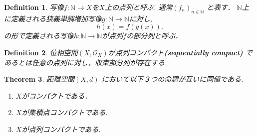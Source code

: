 \documentclass[lualatex]{ltjsbook}
\newtheorem{theorem}{Theorem}[section]
\newtheorem{definition}[theorem]{Definition}
\theoremstyle{remark}
\theoremstyle{plain}
\begin{document}
\begin{definition}
	 写像$f: \mathbb{N} \to X$を$X$上の点列と呼ぶ. 
	 通常$(f_n)_{n \in \mathbb{N}}$ と表す．
	 $\mathbb{N}$上に定義される狭義単調増加写像$g: \mathbb{N} \to  \mathbb{N}$に対し, 
	 \[
	 h(x) = f(g(x))
	 .\] 
	 の形で定義される写像$h: \mathbb{N} \to \mathbb{N}$が点列$f$の部分列と呼ぶ．
\end{definition}

\begin{definition}
	位相空間$\left( X , \mathcal{O}_{X} \right)$が点列コンパクト\textbf{(sequentially compact)}
	であるとは任意の点列に対し，収束部分列が存在する.
\end{definition}

\begin{theorem}
	距離空間$\left( X ,d \right)$ において以下３つの命題が互いに同値である.
	\begin{enumerate}
		\item $X$がコンパクトである．
		\item  $X$が集積点コンパクトである.
		\item $X$が点列コンパクトである.
	\end{enumerate}
\end{theorem}
\end{document}
